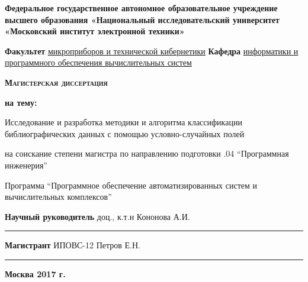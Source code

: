 \newpage

\begin{center}
{\small \textbf{Федеральное государственное автономное образовательное учреждение высшего образования
«Национальный исследовательский университет «Московский институт электронной техники»}}
\end{center}

\begin{flushleft}
{\small \textbf{Факультет} \underline{микроприборов и технической кибернетики}} \linebreak
{\small \textbf{Кафедра} \underline{информатики и программного обеспечения вычислительных систем}}
\end{flushleft}

\vspace{1em}

\begin{center}
\textsc{\textbf{Магистерская диссертация}}
\end{center}

\begin{center}
\textbf{на тему:}
\end{center}

\vspace{1.0em}

\begin{center}
Исследование и разработка методики и алгоритма классификации библиографических данных с помощью условно-случайных полей
\end{center}

\vspace{1em}

\begin{center}
на соискание степени магистра по направлению подготовки .04 “Программная инженерия”
\end{center}

\begin{center}
Программа “Программное обеспечение автоматизированных систем и \linebreak
вычислительных комплексов”
\end{center}

\vspace{\fill}

\begin{flushright}
\textbf{Научный руководитель} доц., к.т.н \linebreak
Кононова А.И. \linebreak
\rule{5cm}{.1pt}

\vspace{1em}

\textbf{Магистрант} ИПОВС-12 \linebreak
Петров Е.Н. \linebreak
\rule{5cm}{.1pt}
\end{flushright}

\begin{center}
\textbf{Москва 2017 г.}
\end{center}

\thispagestyle{empty}